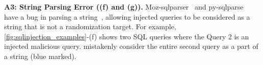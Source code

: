 \noindent
{\bf A3: String Parsing Error ((f) and (g)).} 
Moz-sqlparser~\cite{moz-sql-parser} and py-sqlparse~\cite{andialbrecht/sqlparse} have a bug in parsing a string~\cite{sqlparsebug}, allowing injected queries to be considered as a string that is not a randomization target.
For example, \autoref{fig:sqlinjection_examples}-(f) shows two SQL queries where the Query 2 is an injected malicious query. 
\cite{moz-sql-parser, andialbrecht/sqlparse} mistakenly consider the entire second query as a part of a string (blue marked).



